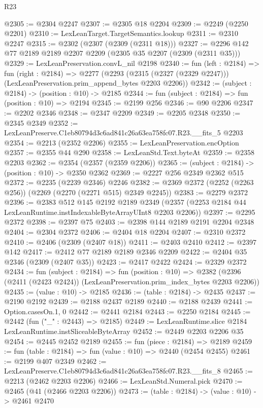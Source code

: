 \begin{lexlean}{R23}
\begin{coremodule}
@2305 := @2304 @2247
@2307 := @2305 @18 @2204
@2309 := @2249 (@2250 @2201)
@2310 := LexLeanTarget.TargetSemantics.lookup
@2311 := @2310 @2247
@2315 := @2302 (@2307 (@2309 (@2311 @18)))
@2327 := @2296 @142 @77 @2189 @2189 @2207 @2209 (@2305 @35 @2207 (@2309 (@2311 @35)))
@2329 := LexLeanPreservation.convL_nil @2198
@2340 := fun (left : @2184) =>
  fun (right : @2184) =>
  @2277 (@2293 (@2315 (@2327 (@2329 @2247))) (LexLeanPreservation.prim_append_bytes @2203 @2206))
@2342 := (subject : @2184) -> (position : @10) -> @2185
@2344 := fun (subject : @2184) => fun (position : @10) => @2194
@2345 := @2199 @256
@2346 := @90 @2206
@2347 := @2202 @2346
@2348 := @2347 @2209
@2349 := @2205 @2348
@2350 := @2345 @2349
@2352 := LexLeanPreserve.C1eb80794d3c6ad841c26a63ea758fc07.R23.__fits_5 @2203
@2354 := @2213 (@2352 @2206)
@2355 := LexLeanPreservation.encOption
@2357 := @2355 @44 @290
@2358 := LexLeanStd.Text.byteAt
@2359 := @2358 @2203
@2362 := @2354 (@2357 (@2359 @2206))
@2365 := (subject : @2184) -> (position : @10) -> @2350 @2362
@2369 := @2227 @256 @2349 @2362 @515
@2372 := @2235 (@2239 @2346) @2246
@2382 := @2369 @2372 (@2252 (@2263 @256)) (@2269 (@2270 (@2271 @515) @2349 @2245))
@2383 := @2279 @2372
@2396 := @2383
    @512
    @145
    @2192
    @2189
    @2349
    (@2357 (@2253 @2184 @44 LexLeanRuntime.instIndexableByteArrayUInt8 @2203 @2206))
@2397 := @2295 @2372
@2398 := @2397 @75
@2403 := @2398 @144 @2189 @2191 @2204 @2348
@2404 := @2304 @2372
@2406 := @2404 @18 @2204
@2407 := @2310 @2372
@2410 := @2406 (@2309 (@2407 @18))
@2411 := @2403 @2410
@2412 := @2397 @142
@2417 := @2412 @77 @2189 @2189 @2346 @2209
@2422 := @2404 @35 @2346 (@2309 (@2407 @35))
@2423 := @2417 @2422
@2424 := @2329 @2372
@2434 := fun (subject : @2184) =>
  fun (position : @10) =>
  @2382 (@2396 (@2411 (@2423 @2424)) (LexLeanPreservation.prim_index_bytes @2203 @2206))
@2435 := (value : @10) -> @2185
@2436 := (table : @2184) -> @2435
@2437 := @2190 @2192
@2439 := @2188 @2437 @2189
@2440 := @2188 @2439
@2441 := Option.casesOn.{1, 0}
@2442 := @2441 @2184
@2443 := @2250 @2184
@2445 := @2442 (fun ("_" : @2443) => @2185)
@2449 := LexLeanRuntime.slice @2184 LexLeanRuntime.instSliceableByteArray
@2452 := @2449 @2203 @2206 @35
@2454 := @2445 @2452 @2189
@2455 := fun (piece : @2184) => @2189
@2459 := fun (table : @2184) => fun (value : @10) => @2440 (@2454 @2455)
@2461 := @2199 @407 @2349
@2462 := LexLeanPreserve.C1eb80794d3c6ad841c26a63ea758fc07.R23.__fits_8
@2465 := @2213 (@2462 @2203 @2206)
@2466 := LexLeanStd.Numeral.pick
@2470 := @2465 (@41 (@2466 @2203 @2206))
@2473 := (table : @2184) -> (value : @10) -> @2461 @2470

\end{coremodule}
\end{lexlean}
